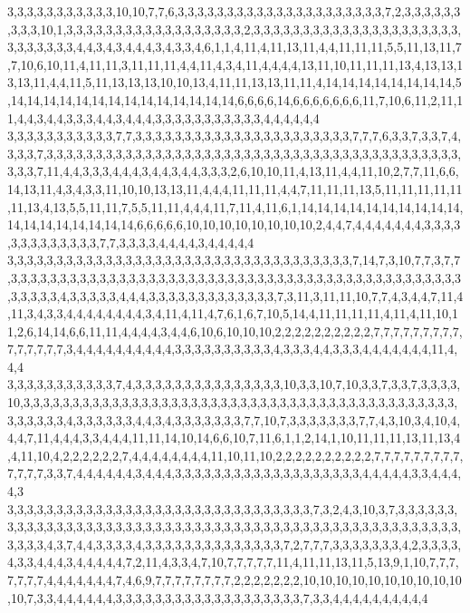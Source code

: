 3,3,3,3,3,3,3,3,3,3,3,10,10,7,7,6,3,3,3,3,3,3,3,3,3,3,3,3,3,3,3,3,3,3,3,3,3,7,2,3,3,3,3,3,3,3,3,3,10,1,3,3,3,3,3,3,3,3,3,3,3,3,3,3,3,3,3,3,2,3,3,3,3,3,3,3,3,3,3,3,3,3,3,3,3,3,3,3,3,3,3,3,3,3,3,3,3,4,4,3,4,3,4,4,4,3,4,3,3,4,6,1,1,4,11,4,11,13,11,4,4,11,11,11,5,5,11,13,11,7,7,10,6,10,11,4,11,11,3,11,11,11,4,4,11,4,3,4,11,4,4,4,4,13,11,10,11,11,11,13,4,13,13,13,13,11,4,4,11,5,11,13,13,13,10,10,13,4,11,11,13,13,11,11,4,14,14,14,14,14,14,14,14,5,14,14,14,14,14,14,14,14,14,14,14,14,14,14,6,6,6,6,14,6,6,6,6,6,6,6,11,7,10,6,11,2,11,11,4,4,3,4,4,3,3,3,4,4,3,4,4,4,3,3,3,3,3,3,3,3,3,3,3,4,4,4,4,4,4
3,3,3,3,3,3,3,3,3,3,3,7,7,3,3,3,3,3,3,3,3,3,3,3,3,3,3,3,3,3,3,3,3,3,3,7,7,7,6,3,3,7,3,3,7,4,3,3,3,7,3,3,3,3,3,3,3,3,3,3,3,3,3,3,3,3,3,3,3,3,3,3,3,3,3,3,3,3,3,3,3,3,3,3,3,3,3,3,3,3,3,3,3,3,3,7,11,4,4,3,3,3,4,4,4,3,4,4,3,4,4,3,3,3,2,6,10,10,11,4,13,11,4,4,11,10,2,7,7,11,6,6,14,13,11,4,3,4,3,3,11,10,10,13,13,11,4,4,4,11,11,11,4,4,7,11,11,11,13,5,11,11,11,11,11,11,13,4,13,5,5,11,11,7,5,5,11,11,4,4,4,11,7,11,4,11,6,1,14,14,14,14,14,14,14,14,14,14,14,14,14,14,14,14,14,14,6,6,6,6,6,10,10,10,10,10,10,10,10,2,4,4,7,4,4,4,4,4,4,4,3,3,3,3,3,3,3,3,3,3,3,3,3,7,7,3,3,3,3,4,4,4,4,3,4,4,4,4,4
3,3,3,3,3,3,3,3,3,3,3,3,3,3,3,3,3,3,3,3,3,3,3,3,3,3,3,3,3,3,3,3,3,3,3,7,14,7,3,10,7,7,3,7,7,3,3,3,3,3,3,3,3,3,3,3,3,3,3,3,3,3,3,3,3,3,3,3,3,3,3,3,3,3,3,3,3,3,3,3,3,3,3,3,3,3,3,3,3,3,3,3,3,3,3,3,4,3,3,3,3,3,4,4,4,3,3,3,3,3,3,3,3,3,3,3,3,3,7,3,11,3,11,11,10,7,7,4,3,4,4,7,11,4,11,3,4,3,3,4,4,4,4,4,4,4,4,3,4,11,4,11,4,7,6,1,6,7,10,5,14,4,11,11,11,11,4,11,4,11,10,11,2,6,14,14,6,6,11,11,4,4,4,4,3,4,4,6,10,6,10,10,10,2,2,2,2,2,2,2,2,2,2,7,7,7,7,7,7,7,7,7,7,7,7,7,7,7,3,4,4,4,4,4,4,4,4,4,4,3,3,3,3,3,3,3,3,3,3,4,3,3,3,4,4,3,3,3,4,4,4,4,4,4,4,11,4,4,4
3,3,3,3,3,3,3,3,3,3,3,7,4,3,3,3,3,3,3,3,3,3,3,3,3,3,3,3,10,3,3,10,7,10,3,3,7,3,3,7,3,3,3,3,10,3,3,3,3,3,3,3,3,3,3,3,3,3,3,3,3,3,3,3,3,3,3,3,3,3,3,3,3,3,3,3,3,3,3,3,3,3,3,3,3,3,3,3,3,3,3,3,3,3,3,4,3,3,3,3,3,3,4,4,3,4,3,3,3,3,3,3,3,7,7,10,7,3,3,3,3,3,3,3,7,7,4,3,10,3,4,10,4,4,4,7,11,4,4,4,3,3,4,4,4,11,11,14,10,14,6,6,10,7,11,6,1,1,2,14,1,10,11,11,11,13,11,13,4,4,11,10,4,2,2,2,2,2,2,7,4,4,4,4,4,4,4,4,11,10,11,10,2,2,2,2,2,2,2,2,2,2,7,7,7,7,7,7,7,7,7,7,7,7,7,3,3,7,4,4,4,4,4,4,3,4,4,4,3,3,3,3,3,3,3,3,3,3,3,3,3,3,3,3,3,3,3,4,4,4,4,4,3,3,4,4,4,4,3
3,3,3,3,3,3,3,3,3,3,3,3,3,3,3,3,3,3,3,3,3,3,3,3,3,3,3,3,3,3,3,7,3,2,4,3,10,3,7,3,3,3,3,3,3,3,3,3,3,3,3,3,3,3,3,3,3,3,3,3,3,3,3,3,3,3,3,3,3,3,3,3,3,3,3,3,3,3,3,3,3,3,3,3,3,3,3,3,3,3,3,3,3,3,3,4,3,7,4,4,3,3,3,3,4,3,3,3,3,3,3,3,3,3,3,3,3,3,3,7,2,7,7,7,3,3,3,3,3,3,3,4,2,3,3,3,3,4,3,3,4,4,4,3,4,4,4,4,4,7,2,11,4,3,3,4,7,10,7,7,7,7,7,11,4,11,11,13,11,5,13,9,1,10,7,7,7,7,7,7,7,4,4,4,4,4,4,4,7,4,6,9,7,7,7,7,7,7,7,7,2,2,2,2,2,2,2,10,10,10,10,10,10,10,10,10,10,10,7,3,3,4,4,4,4,4,4,3,3,3,3,3,3,3,3,3,3,3,3,3,3,3,3,3,3,3,7,3,3,4,4,4,4,4,4,4,4,4,4
